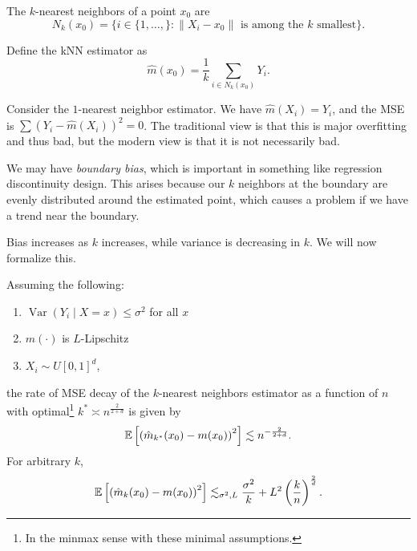 \begin{definition}
	 The $k$-nearest neighbors of a point $x_0$ are \[
	N_k(x_0) = \{i \in \{1,\ldots,\} : \|X_i - x_0\| \text{ is among the $k$ smallest}\}
.\] 
\end{definition}

\begin{definition}
	Define the kNN estimator as \[
		\hat{m}(x_0) = \frac{1}{k} \sum_{i \in N_k(x_0)} Y_i
	.\] 
\end{definition}

Consider the $1$-nearest neighbor estimator. We have $\hat{m}(X_i) = Y_i$, and the MSE is $\sum \left( Y_i - \hat{m}(X_i) \right)^2 = 0$. The traditional view is that this is major overfitting and thus bad, but the modern view is that it is not necessarily bad.

We may have \emph{boundary bias}, which is important in something like regression discontinuity design. This arises because our $k$ neighbors at the boundary are evenly distributed around the estimated point, which causes a problem if we have a trend near the boundary.

Bias increases as $k$ increases, while variance is decreasing in $k$. We will now formalize this.


\begin{proposition}
	Assuming the following:
	\begin{enumerate}[label=(\roman*)]
		\item $\operatorname{Var}\left(Y_i \mid X= x\right) \le \sigma^2$ for all $x$
		\item $m(\cdot ) $ is $L$-Lipschitz
		\item $X_i \sim U\left[ 0,1 \right]^{d}$,
	\end{enumerate}
	the rate of MSE decay of the $k$-nearest neighbors estimator as a function of $n$ with optimal\footnote{In the minmax sense with these minimal assumptions.} $k^* \asymp n^{\frac{2}{2+d}}$ is given by \[
		\mathbb{E}\left[\left( \hat{m}_{k^*}(x_0) - m(x_0) \right)^2\right]  \lesssim n^{-\frac{2}{2+d}}
	.\] For arbitrary $k$, \[
			\mathbb{E}\left[\left( \hat{m}_{k}(x_0) - m(x_0) \right)^2\right] \lesssim_{\sigma^2,L} \frac{\sigma^2}{k} + L^2\left( \frac{k}{n} \right)^{\frac{2}{d}}
	.\] 
\end{proposition}


